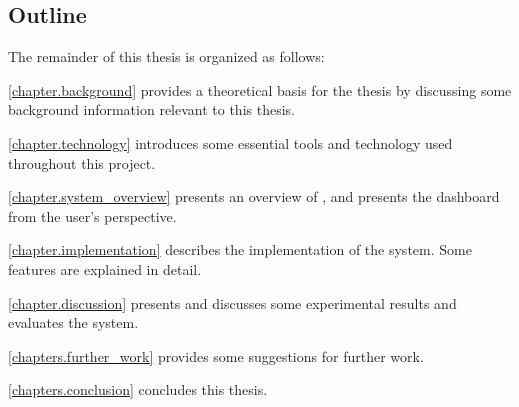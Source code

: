 
\subsection{Outline}

The remainder of this thesis is organized as follows:

\begin{Description}
  \item[\betterfakesc{Chapter} \ref{chapter.background}]\indent provides a theoretical basis for the thesis by discussing some background information relevant to this thesis.
  \item[\betterfakesc{Chapter} \ref{chapter.technology}]introduces some essential tools and technology used throughout this project.
  \item[\betterfakesc{Chapter} \ref{chapter.system_overview}]presents an overview of \toolname, and presents the dashboard from the user's perspective.
  \item[\betterfakesc{Chapter} \ref{chapter.implementation}]describes the implementation of the system. Some features are explained in detail.
  \item[\betterfakesc{Chapter} \ref{chapter.discussion}]presents and discusses some experimental results and evaluates the system.
    \item[\betterfakesc{Chapter} \ref{chapters.further_work}]provides some suggestions for further work.
  \item[\betterfakesc{Chapter} \ref{chapters.conclusion}]concludes this thesis.
\end{Description}